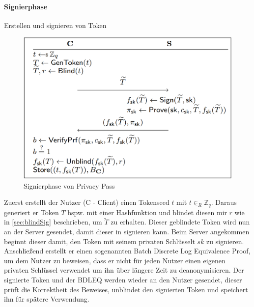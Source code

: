 \documentclass[11pt,a4paper]{scrreprt}
\begin{document}
\paragraph{Signierphase} Erstellen und signieren von Token\\

\begin{figure}[H]
    \centering
    \includegraphics[width=0.5\linewidth]{pp_signphase.png}
    \caption{Signierphase von Privacy Pass \cite{pp-davidson2018privacy}}
    \label{fig:pp-signingphase}
\end{figure}
Zuerst erstellt der Nutzer (C - Client) einen Tokenseed $t$ mit $t \in_R \mathbb{Z}_q $. Daraus generiert er Token $T$ bspw. mit einer Hashfunktion und blindet diesen mir $r$ wie in \ref{sec:blindSig} beschrieben, um $\widetilde{T}$ zu erhalten. Dieser geblindete Token wird nun an der Server gesendet, damit dieser in signieren kann. Beim Server angekommen beginnt dieser damit, den Token mit seinem privaten Schlüsselt $sk$ zu signieren. Anschließend erstellt er einen sogenannten Batch Discrete Log Equivalence Proof, um dem Nutzer zu beweisen, dass er nicht für jeden Nutzer einen eigenen privaten Schlüssel verwendet um ihn über längere Zeit zu deanonymisieren. Der signierte Token und der BDLEQ werden wieder an den Nutzer gesendet, dieser prüft die Korrektheit des Beweises, unblindet den signierten Token und speichert ihn für spätere Verwendung. 
\end{document}
